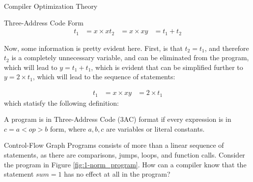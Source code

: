\begin{section}{Compiler Optimization Theory}
\begin{subsubsection}{Three-Address Code Form}
\begin{align}
t_1 &= x \times x
t_2 &= x \times x
y &= t_1 + t_2
\end{align}

Now, some information is pretty evident here. First, is that $t_2 = t_1$,
and therefore $t_2$ is a completely unnecessary variable, and can be
eliminated from the program, which will lead to $y = t_1 + t_1$, which is
evident that can be simplified further to $y = 2 \times t_1$, which will lead
to the sequence of statements:

\begin{align}
t_1 &= x \times x
y &= 2 \times t_1
\end{align}
which statisfy the following definition:
\begin{definition}
	A program is in Three-Address Code (3AC) format if every expression is
	in $c = a <op> b$ form, where $a, b, c$ are variables or
	literal constants.
\end{definition}

\end{subsubsection}

\begin{subsubsection}{Control-Flow Graph}
	Programs consists of more than a linear sequence of statements, as there are
	comparisons, jumps, loops, and function calls. Consider the program in
	Figure \ref{fig:1-norm_program}. How can a compiler know that the statement
	$\textit{sum} = 1$ has no effect at all in the program?


\end{subsubsection}
\end{section}
